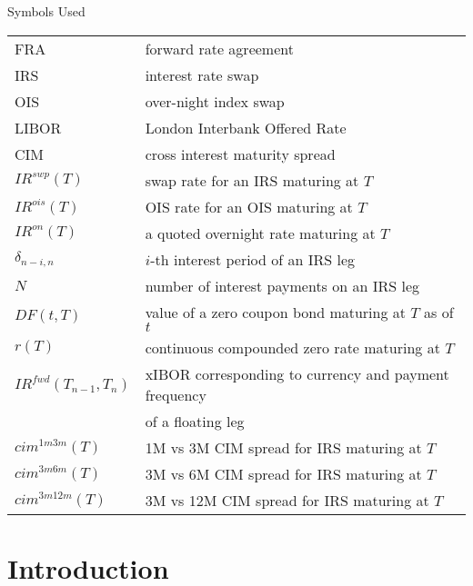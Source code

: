 \documentclass{beamer}
\begin{document}
\begin{frame}{Symbols Used}
\begin{tabular}{l l}
FRA & forward rate agreement\\
IRS & interest rate swap\\
OIS & over-night index swap\\
LIBOR & London Interbank Offered Rate\\
CIM & cross interest maturity spread\\
$IR^{swp}(T)$ & swap rate for an IRS maturing at $T$\\
$IR^{ois}(T)$ & OIS rate for an OIS maturing at $T$\\
$IR^{on}(T)$ & a quoted overnight rate maturing at $T$\\
$\delta_{n-i, n}$ & $i$-th interest period of an IRS leg\\
$N$ & number of interest payments on an IRS leg\\
$DF(t, T)$ & value of a zero coupon bond maturing at $T$ as of $t$\\
$r(T)$ & continuous compounded zero rate maturing at $T$\\
$IR^{fwd}(T_{n-1}, T_n)$ & xIBOR corresponding to currency and payment frequency\\
 & of a floating leg\\
$cim^{1m3m}(T)$ & 1M vs 3M CIM spread for IRS maturing at $T$\\
$cim^{3m6m}(T)$ & 3M vs 6M CIM spread for IRS maturing at $T$\\
$cim^{3m12m}(T)$ & 3M vs 12M CIM spread for IRS maturing at $T$\\
\end{tabular}
\end{frame}

\section{Introduction}
\end{document}
